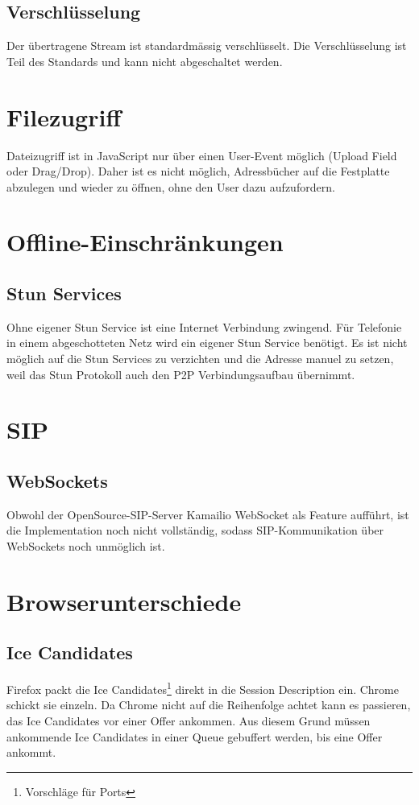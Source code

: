 		\subsection{Verschlüsselung}
			Der übertragene Stream ist standardmässig verschlüsselt. Die Verschlüsselung ist Teil des Standards und kann nicht abgeschaltet werden.
	 	
	 
	 \section{Filezugriff}
	 	Dateizugriff ist in JavaScript nur über einen User-Event möglich (Upload
	 	Field oder Drag/Drop). Daher ist es nicht möglich, Adressbücher auf die
	 	Festplatte abzulegen und wieder zu öffnen, ohne den User dazu aufzufordern.
	 	
	 
	 \section{Offline-Einschränkungen}
	 	\subsection{Stun Services}
			Ohne eigener Stun Service ist eine Internet Verbindung zwingend. Für Telefonie in einem abgeschotteten Netz wird ein eigener Stun Service benötigt. Es ist nicht möglich auf die Stun Services zu verzichten und die Adresse manuel zu setzen, weil das Stun Protokoll auch den P2P Verbindungsaufbau übernimmt.
	 	
	 		
	 \section{SIP}
	 	\subsection{WebSockets}
	 		Obwohl der OpenSource-SIP-Server Kamailio WebSocket als Feature aufführt,
	 		ist die Implementation noch nicht vollständig, sodass SIP-Kommunikation über
	 		WebSockets noch unmöglich ist.
	 		
	\section{Browserunterschiede}
		\subsection{Ice Candidates}
			Firefox packt die Ice Candidates\footnote{Vorschläge für Ports} direkt in die Session Description ein. Chrome schickt sie einzeln. Da Chrome nicht auf die Reihenfolge achtet kann es passieren, das Ice Candidates vor einer Offer ankommen. Aus diesem Grund müssen ankommende Ice Candidates in einer Queue gebuffert werden, bis eine Offer ankommt.
		
